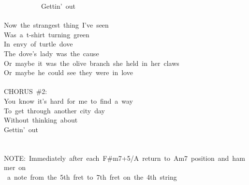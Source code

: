 {\ \ \ \ \ \ \ \ \ \ \ Gettin'\ out\\
\\
Now\ the\ strangest\ thing\ I've\ seen\\
Was\ a\ t-shirt\ turning\ green\\
In\ envy\ of\ turtle\ dove\\
The\ dove's\ lady\ was\ the\ cause\\
Or\ maybe\ it\ was\ the\ olive\ branch\ she\ held\ in\ her\ claws\\
Or\ maybe\ he\ could\ see\ they\ were\ in\ love\\
\\
CHORUS\ \#2:\\
You\ know\ it's\ hard\ for\ me\ to\ find\ a\ way\\
To\ get\ through\ another\ city\ day\\
Without\ thinking\ about\\
Gettin'\ out\\
\\
\\
NOTE:\ Immediately\ after\ each\ F\#m7+5/A\ return\ to\ Am7\ position\ and\ hammer\ on\\
\ a\ note\ from\ the\ 5th\ fret\ to\ 7th\ fret\ on\ the\ 4th\ string}
